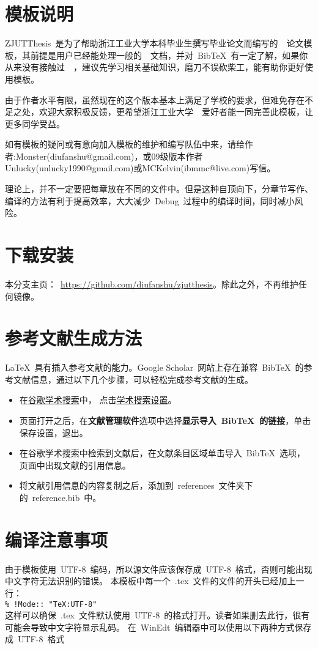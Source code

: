\section{模板说明}

ZJUTThesis~是为了帮助浙江工业大学本科毕业生撰写毕业论文而编写的~\XeLaTeX~论文模板，其前提是用户已经能处理一般的~\XeLaTeX~文档，并对~BibTeX~有一定了解，如果你从来没有接触过~\XeLaTeX~，建议先学习相关基础知识，磨刀不误砍柴工，能有助你更好使用模板\cite{huwei}。

由于作者水平有限，虽然现在的这个版本基本上满足了学校的要求，但难免存在不足之处，欢迎大家积极反馈，更希望浙江工业大学~\XeLaTeX~爱好者能一同完善此模板，让更多同学受益。

如有模板的疑问或有意向加入模板的维护和编写队伍中来，请给作者:Monster(diufanshu@gmail.com)，或09级版本作者 Unlucky(unlucky1990@gmail.com)或MCKelvin(ibmmc@live.com)写信。


理论上，并不一定要把每章放在不同的文件中。但是这种自顶向下，分章节写作、编译的方法有利于提高效率，大大减少~Debug~过程中的编译时间，同时减小风险。

\section{下载安装}
本分支主页：~\url{https://github.com/diufanshu/zjutthesis}。除此之外，不再维护任何镜像。


\section{参考文献生成方法}

\LaTeX~具有插入参考文献的能力。Google Scholar~网站上存在兼容~BibTeX~的参考文献信息，通过以下几个步骤，可以轻松完成参考文献的生成。
\begin{itemize}
  \item 在\href{http://scholar.google.com/}{谷歌学术搜索}中，
        点击\href{http://scholar.google.com/scholar_preferences?hl=en&as_sdt=0,5}{学术搜索设置}。
  \item 页面打开之后，在\textbf{文献管理软件}选项中选择\textbf{显示导入~BibTeX~的链接}，单击保存设置，退出。
  \item 在谷歌学术搜索中检索到文献后，在文献条目区域单击导入~BibTeX~选项，页面中出现文献的引用信息。
  \item 将文献引用信息的内容复制之后，添加到~references~文件夹下的~reference.bib~中。
\end{itemize}

\section{编译注意事项}
由于模板使用~UTF-8~编码，所以源文件应该保存成~UTF-8~格式，否则可能出现中文字符无法识别的错误。
  本模板中每一个~.tex~文件的文件的开头已经加上一行：\\
  \verb|% !Mode:: "TeX:UTF-8"|\\
     这样可以确保~.tex~文件默认使用~UTF-8~的格式打开。读者如果删去此行，很有可能会导致中文字符显示乱码。
     在~WinEdt~编辑器中可以使用以下两种方式保存成~UTF-8~格式

